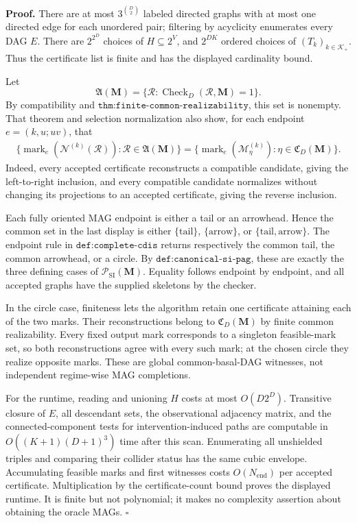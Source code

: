 \textbf{Proof.}
There are at most \(3^{\binom D2}\) labeled directed graphs with at most one directed edge for each unordered pair; filtering by acyclicity enumerates every DAG \(E\).  There are \(2^{2^D}\) choices of \(H\subseteq 2^V\), and \(2^{DK}\) ordered choices of \((T_k)_{k\in\mathcal K_+}\).  Thus the certificate list is finite and has the displayed cardinality bound.

Let
\[
\mathfrak A(\mathbf M)=\{\mathcal R:\operatorname{Check}_{D}(\mathcal R,\mathbf M)=1\}.
\]
By compatibility and \(\texttt{thm:finite-common-realizability}\), this set is nonempty.  That theorem and selection normalization also show, for each endpoint \(e=(k,u;uv)\), that
\[
\begin{aligned}
\{\operatorname{mark}_e(\mathcal N^{(k)}(\mathcal R)):\mathcal R\in\mathfrak A(\mathbf M)\}
=\{\operatorname{mark}_e(\mathcal M_\eta^{(k)}):\eta\in\mathfrak C_D(\mathbf M)\}.
\end{aligned}
\]
Indeed, every accepted certificate reconstructs a compatible candidate, giving the left-to-right inclusion, and every compatible candidate normalizes without changing its projections to an accepted certificate, giving the reverse inclusion.

Each fully oriented MAG endpoint is either a tail or an arrowhead.  Hence the common set in the last display is either \(\{\mathrm{tail}\}\), \(\{\mathrm{arrow}\}\), or \(\{\mathrm{tail},\mathrm{arrow}\}\).  The endpoint rule in \(\texttt{def:complete-cdis}\) returns respectively the common tail, the common arrowhead, or a circle.  By \(\texttt{def:canonical-si-pag}\), these are exactly the three defining cases of \(\mathcal P_{\mathrm{SI}}(\mathbf M)\).  Equality follows endpoint by endpoint, and all accepted graphs have the supplied skeletons by the checker.

In the circle case, finiteness lets the algorithm retain one certificate attaining each of the two marks.  Their reconstructions belong to \(\mathfrak C_D(\mathbf M)\) by finite common realizability.  Every fixed output mark corresponds to a singleton feasible-mark set, so both reconstructions agree with every such mark; at the chosen circle they realize opposite marks.  These are global common-basal-DAG witnesses, not independent regime-wise MAG completions.

For the runtime, reading and unioning \(H\) costs at most \(O(D2^D)\).  Transitive closure of \(E\), all descendant sets, the observational adjacency matrix, and the connected-component tests for intervention-induced paths are computable in \(O((K+1)(D+1)^3)\) time after this scan.  Enumerating all unshielded triples and comparing their collider status has the same cubic envelope.  Accumulating feasible marks and first witnesses costs \(O(N_{\mathrm{end}})\) per accepted certificate.  Multiplication by the certificate-count bound proves the displayed runtime.  It is finite but not polynomial; it makes no complexity assertion about obtaining the oracle MAGs. \(\square\)